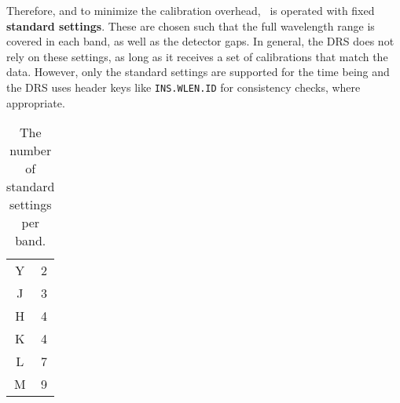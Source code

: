 Therefore, and to minimize the calibration overhead,
\instrument\ is operated with fixed \textbf{standard settings}. These are
chosen such that the full wavelength range is covered in each band, as well as
the detector gaps. In general, the DRS does not rely on these settings, as long
as it receives a set of calibrations that match the data. However, only
the standard settings are supported for the time being and the DRS uses
header keys like \texttt{INS.WLEN.ID} for consistency checks, where appropriate.

\begin{table}[htbp]
  \centering\begin{tabular}{cc}
  Y  & 2\\
  J  & 3\\
  H  & 4\\
  K  & 4\\
  L  & 7\\
  M  & 9\\
  \end{tabular}
  \caption{The number of standard settings per band.}
  \label{tab:nsettings}
\end{table}